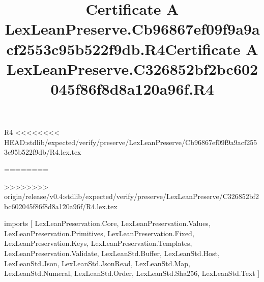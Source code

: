 \begin{lexlean}{R4}
<<<<<<<< HEAD:stdlib/expected/verify/preserve/LexLeanPreserve/Cb96867ef09f9a9acf2553c95b522f9db/R4.lex.tex
\title{Certificate A LexLeanPreserve.Cb96867ef09f9a9acf2553c95b522f9db.R4}
========
\title{Certificate A LexLeanPreserve.C326852bf2bc602045f86f8d8a120a96f.R4}
>>>>>>>> origin/release/v0.4:stdlib/expected/verify/preserve/LexLeanPreserve/C326852bf2bc602045f86f8d8a120a96f/R4.lex.tex
\begin{coremodule}
imports [
  LexLeanPreservation.Core,
  LexLeanPreservation.Values,
  LexLeanPreservation.Primitives,
  LexLeanPreservation.Fixed,
  LexLeanPreservation.Keys,
  LexLeanPreservation.Templates,
  LexLeanPreservation.Validate,
  LexLeanStd.Buffer,
  LexLeanStd.Host,
  LexLeanStd.Json,
  LexLeanStd.JsonRead,
  LexLeanStd.Map,
  LexLeanStd.Numeral,
  LexLeanStd.Order,
  LexLeanStd.Sha256,
  LexLeanStd.Text
]


\end{coremodule}
\end{lexlean}
